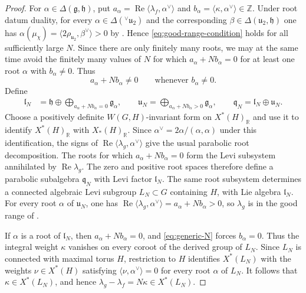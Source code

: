 \documentclass[10pt]{amsart}
\numberwithin{equation}{section}
\theoremstyle{plain}
\theoremstyle{definition}
\theoremstyle{remark}
\newcommand{\RR}{\mathbb R}
\newcommand{\ZZ}{\mathbb Z}
\newcommand{\fg}{\mathfrak g}
\newcommand{\fq}{\mathfrak q}
\newcommand{\fu}{\mathfrak u}
\newcommand{\fh}{\mathfrak h}
\newcommand{\vfu}{{}^{\vee}\fu}
\begin{document}
\begin{proof}
For $\alpha\in\Delta(\fg,\fh)$, put
$a_\alpha=\operatorname{Re}\langle\lambda_f,\alpha^\vee\rangle$ and
$b_\alpha=\langle\kappa,\alpha^\vee\rangle\in\ZZ$.
Under root datum duality, for every $\alpha\in\Delta(\vfu_2)$ and
the corresponding $\beta\in\Delta(\fu_2,\fh)$ one has
$\alpha(\mu_\chi)=\langle2\rho_{\fu_2},\beta^\vee\rangle>0$
by \cite[Lemma~2.5.4]{AIMV26}. Hence
\eqref{eq:good-range-condition} holds for all sufficiently large $N$.
Since there are only finitely many roots, we
may at the same time avoid the finitely many values of $N$ for which
$a_\alpha+Nb_\alpha=0$ for at least one root $\alpha$ with
$b_\alpha\neq0$. Thus
\begin{equation}\label{eq:generic-N}
 a_\alpha+Nb_\alpha\neq0
 \qquad
 \text{whenever }b_\alpha\neq0.
\end{equation}
Define
\[
\begin{aligned}
 \mathfrak l_N
 &=
 \fh\oplus
 \bigoplus_{a_\alpha+Nb_\alpha=0}\fg_\alpha,
 \qquad
 \mathfrak u_N = \bigoplus_{a_\alpha+Nb_\alpha>0}\fg_\alpha,
 \qquad
 \fq_N=\mathfrak l_N\oplus\mathfrak u_N.
\end{aligned}
\]
Choose a positively definite $W(G,H)$-invariant form on $X^*(H)_\RR$ and use
it to identify $X^*(H)_\RR$ with $X_*(H)_\RR$. Since
$\alpha^\vee=2\alpha/(\alpha,\alpha)$ under this identification, the signs
of $\operatorname{Re}\langle\lambda_g,\alpha^\vee\rangle$ give the usual
parabolic root decomposition. The roots for which
$a_\alpha+Nb_\alpha=0$ form the Levi subsystem annihilated by
$\operatorname{Re}\lambda_g$. The zero and positive root spaces therefore
define a parabolic subalgebra $\fq_N$ with Levi factor $\mathfrak l_N$.
The same root subsystem determines a connected algebraic Levi subgroup
$L_N\subset G$ containing $H$, with Lie algebra $\mathfrak l_N$.
For every root $\alpha$ of $\mathfrak u_N$, one has
$\operatorname{Re}\langle\lambda_g,\alpha^\vee\rangle
=a_\alpha+Nb_\alpha>0$, so $\lambda_g$ is in the good range of
\cite[Definition~2.5.3]{AIMV26}.

If $\alpha$ is a root of $\mathfrak l_N$, then
$a_\alpha+Nb_\alpha=0$, and \eqref{eq:generic-N} forces
$b_\alpha=0$. Thus the integral weight $\kappa$ vanishes on every
coroot of the derived group of $L_N$. Since $L_N$ is connected with maximal
torus $H$, restriction to $H$ identifies $X^*(L_N)$ with the weights
$\nu\in X^*(H)$ satisfying $\langle\nu,\alpha^\vee\rangle=0$ for every root
$\alpha$ of $L_N$.
It follows that $\kappa\in X^*(L_N)$, and hence
$\lambda_g-\lambda_f=N\kappa\in X^*(L_N)$.
\end{proof}
\end{document}
